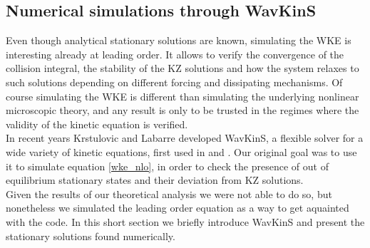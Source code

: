     \subsection{Numerical simulations through WavKinS}

    Even though analytical stationary solutions are known, simulating the WKE is interesting already at leading order. It allows to verify the convergence of the collision integral, the stability of the KZ solutions and how the system relaxes to such solutions depending on different forcing and dissipating mechanisms. Of course simulating the WKE is different than simulating the underlying nonlinear microscopic theory, and any result is only to be trusted in the regimes where the validity of the kinetic equation is verified. \\

    In recent years Krstulovic and Labarre developed WavKinS, a flexible solver for a wide variety of kinetic equations, first used in \cite{Giorgio1} and \cite{Giorgio2}. Our original goal was to use it to 
    simulate equation \eqref{wke_nlo}, in order to check the presence of out of equilibrium stationary states and their deviation from KZ solutions.\\
    Given the results of our theoretical analysis we were not able to do so, but nonetheless we simulated the leading order equation as a way to get aquainted with the code. In this short section we briefly introduce WavKinS and present the stationary solutions found numerically. \\
    
